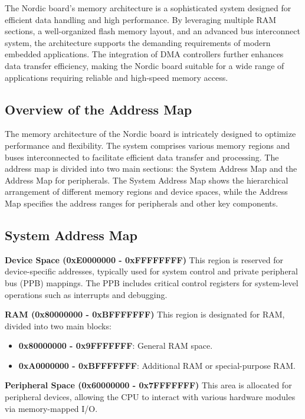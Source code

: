 \documentclass{Configuration_Files/PoliMi3i_thesis}
\begin{document}
The Nordic board's memory architecture is a sophisticated system designed for efficient data handling and high performance. By leveraging multiple RAM sections, a well-organized flash memory layout, and an advanced bus interconnect system, the architecture supports the demanding requirements of modern embedded applications. The integration of DMA controllers further enhances data transfer efficiency, making the Nordic board suitable for a wide range of applications requiring reliable and high-speed memory access.

\subsection{Overview of the Address Map}
The memory architecture of the Nordic board is intricately designed to optimize performance and flexibility. The system comprises various memory regions and buses interconnected to facilitate efficient data transfer and processing.
The address map is divided into two main sections: the System Address Map and the Address Map for peripherals. The System Address Map shows the hierarchical arrangement of different memory regions and device spaces, while the Address Map specifies the address ranges for peripherals and other key components.

\subsection{System Address Map}

\textbf{Device Space (0xE0000000 - 0xFFFFFFFF)}
This region is reserved for device-specific addresses, typically used for system control and private peripheral bus (PPB) mappings. The PPB includes critical control registers for system-level operations such as interrupts and debugging.

\textbf{RAM (0x80000000 - 0xBFFFFFFF)}
This region is designated for RAM, divided into two main blocks:
\begin{itemize}
    \item \textbf{0x80000000 - 0x9FFFFFFF}: General RAM space.
    \item \textbf{0xA0000000 - 0xBFFFFFFF}: Additional RAM or special-purpose RAM.
\end{itemize}

\textbf{Peripheral Space (0x60000000 - 0x7FFFFFFF)}
This area is allocated for peripheral devices, allowing the CPU to interact with various hardware modules via memory-mapped I/O.
\end{document}
